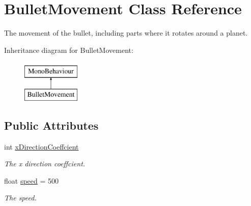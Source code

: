 \hypertarget{class_bullet_movement}{}\section{Bullet\+Movement Class Reference}
\label{class_bullet_movement}


The movement of the bullet, including parts where it rotates around a planet.  


Inheritance diagram for Bullet\+Movement\+:\begin{figure}[H]
\begin{center}
\leavevmode
\includegraphics[height=2.000000cm]{class_bullet_movement}
\end{center}
\end{figure}
\subsection*{Public Attributes}
\begin{DoxyCompactItemize}
\item 
int \mbox{\hyperlink{class_bullet_movement_a87f4f6ec7b16819ee058cfc9121660e0}{x\+Direction\+Coeffcient}}
\begin{DoxyCompactList}\small\item\em The x direction coeffcient. \end{DoxyCompactList}\item 
float \mbox{\hyperlink{class_bullet_movement_aeb1ed7a8c4bd668bb3039562e46fa63b}{speed}} = 500
\begin{DoxyCompactList}\small\item\em The speed. \end{DoxyCompactList}\end{DoxyCompactItemize}
